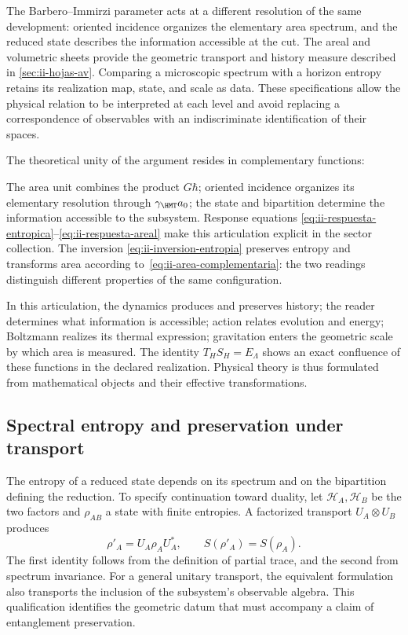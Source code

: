 The Barbero--Immirzi parameter acts at a different resolution
of the same development: oriented incidence organizes the elementary
area spectrum, and the reduced state describes the information
accessible at the cut. The areal and volumetric sheets provide the
geometric transport and history measure described in
\cref{sec:ii-hojas-av}. Comparing a microscopic spectrum
with a horizon entropy retains its realization map,
state, and scale as data. These specifications allow the
physical relation to be interpreted at each level and avoid replacing a correspondence
of observables with an indiscriminate identification of their spaces.

The theoretical unity of the argument resides in complementary functions:

The area unit combines the product $G\hbar$; oriented incidence
organizes its elementary resolution through $\gamma_{\HMT}a_0$; the
state and bipartition determine the information accessible to the
subsystem. Response equations
\eqref{eq:ii-respuesta-entropica}--\eqref{eq:ii-respuesta-areal}
make this articulation explicit in the sector collection. The inversion
\eqref{eq:ii-inversion-entropia} preserves entropy and transforms
area according to~\eqref{eq:ii-area-complementaria}: the two readings
distinguish different properties of the same configuration.

In this articulation,
the dynamics produces and preserves history; the reader determines what
information is accessible; action relates evolution and energy;
Boltzmann realizes its thermal expression; gravitation enters
the geometric scale by which area is measured. The identity
\(T_HS_H=E_\Lambda\) shows an exact confluence of these functions
in the declared realization. Physical theory is thus formulated from
mathematical objects and their effective transformations.

\subsection{Spectral entropy and preservation under transport}

The entropy of a reduced state depends on its spectrum and on the
bipartition defining the reduction. To specify continuation
toward duality, let \(\mathcal H_A,\mathcal H_B\) be the two factors
and \(\rho_{AB}\) a state with finite entropies. A factorized
transport \(U_A\otimes U_B\) produces
\[
 \rho'_A=U_A\rho_AU_A^*,\qquad S(\rho'_A)=S(\rho_A).
\]
The first identity follows from the definition of partial trace, and the
second from spectrum invariance. For a general unitary
transport, the equivalent formulation also transports
the inclusion of the subsystem's observable algebra. This qualification
identifies the geometric datum that must accompany a claim
of entanglement preservation.

